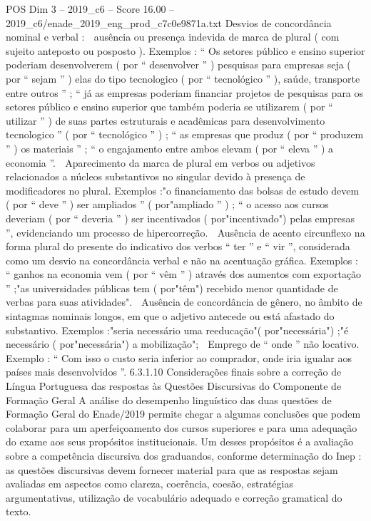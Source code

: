 \begin{textsample}{POS Dim 3 – 2019\_c6 – Score 16.00 – 2019\_c6/enade\_2019\_eng\_prod\_c7c0e9871a.txt}
Desvios de concordância nominal e verbal :  ausência ou presença indevida de marca de plural ( com sujeito anteposto ou posposto ).
Exemplos : “ Os setores público e ensino superior poderiam desenvolverem ( por “ desenvolver ” ) pesquisas para empresas seja ( por “ sejam ” ) elas do tipo tecnologico ( por “ tecnológico ” ), saúde, transporte entre outros ” ; “ já as empresas poderiam financiar projetos de pesquisas para os setores público e ensino superior que também poderia se utilizarem ( por “ utilizar ” ) de suas partes estruturais e acadêmicas para desenvolvimento tecnologico ” ( por “ tecnológico ” ) ; “ as empresas que produz ( por “ produzem ” ) os materiais ” ; “ o engajamento entre ambos elevam ( por “ eleva ” ) a economia ”.  Aparecimento da marca de plural em verbos ou adjetivos relacionados a núcleos substantivos no singular devido à presença de modificadores no plural.
Exemplos :"o financiamento das bolsas de estudo devem ( por “ deve ” ) ser ampliados ” ( por"ampliado ” ) ; “ o acesso aos cursos deveriam ( por “ deveria ” ) ser incentivados ( por"incentivado") pelas empresas ”, evidenciando um processo de hipercorreção.  Ausência de acento circunflexo na forma plural do presente do indicativo dos verbos “ ter ” e “ vir ”, considerada como um desvio na concordância verbal e não na acentuação gráfica.
Exemplos : “ ganhos na economia vem ( por “ vêm ” ) através dos aumentos com exportação ” ;"as universidades públicas tem ( por"têm") recebido menor quantidade de verbas para suas atividades".  Ausência de concordância de gênero, no âmbito de sintagmas nominais longos, em que o adjetivo antecede ou está afastado do substantivo.
Exemplos :"seria necessário uma reeducação"( por"necessária") ;"é necessário ( por"necessária") a mobilização";  Emprego de “ onde ” não locativo.
Exemplo : “ Com isso o custo seria inferior ao comprador, onde iria igualar aos países mais desenvolvidos ”. 6.3.1.10 Considerações finais sobre a correção de Língua Portuguesa das respostas às Questões Discursivas do Componente de Formação Geral A análise do desempenho linguístico das duas questões de Formação Geral do Enade/2019 permite chegar a algumas conclusões que podem colaborar para um aperfeiçoamento dos cursos superiores e para uma adequação do exame aos seus propósitos institucionais.
Um desses propósitos é a avaliação sobre a competência discursiva dos graduandos, conforme determinação do Inep : as questões discursivas devem fornecer material para que as respostas sejam avaliadas em aspectos como clareza, coerência, coesão, estratégias argumentativas, utilização de vocabulário adequado e correção gramatical do texto.

\end{textsample}
